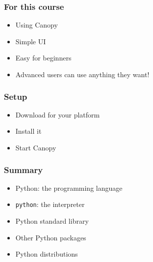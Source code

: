 \documentclass[14pt,compress]{beamer}
\newcommand{\typ}[1]{\lstinline{#1}}
\begin{document}
\begin{frame}[plain]
  \frametitle{For this course}
  \begin{itemize}
  \item Using Canopy
  \item Simple UI
  \item Easy for beginners
    \vspace*{0.25in}
  \item Advanced users can use anything they want!
  \end{itemize}
\end{frame}

\begin{frame}[plain]
  \frametitle{Setup}
  \begin{itemize}
    \item Download for your platform
    \item Install it
    \item Start Canopy
  \end{itemize}
\end{frame}

\begin{frame}[plain]
  \frametitle{Summary}
  \begin{itemize}
  \item Python: the programming language
  \item \typ{python}: the interpreter
  \item Python standard library
  \item Other Python packages
  \item Python distributions
  \end{itemize}
\end{frame}
\end{document}
